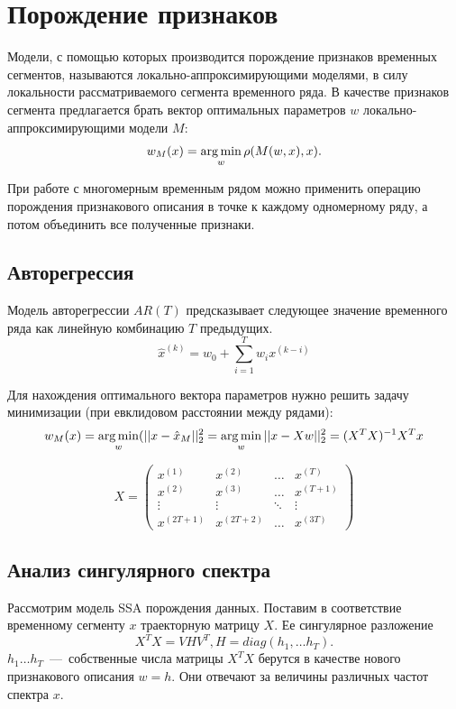 \documentclass[12pt, twoside]{article}
\begin{document}
\section{Порождение признаков}

Модели, с помощью которых производится порождение признаков временных сегментов, называются локально-аппроксимирующими моделями, в силу локальности рассматриваемого сегмента временного ряда. В качестве признаков сегмента предлагается брать вектор оптимальных параметров $w$ локально-аппроксимирующими модели $M$: $$w_M(x)=\argmin\limits_{w}\rho(M(w,x),x).$$

При работе с многомерным временным рядом можно применить операцию порождения признакового описания в точке к каждому одномерному ряду, а потом объединить все полученные признаки.


\subsection{Авторегрессия}
Модель авторегрессии $AR(T)$ предсказывает следующее значение временного ряда как линейную комбинацию $T$ предыдущих.
$$\hat x^{(k)}=w_0+\sum\limits_{i=1}^T w_i x^{(k-i)}$$

Для нахождения оптимального вектора параметров нужно решить задачу минимизации (при евклидовом расстоянии между рядами):
$$w_M(x)=\argmin_w(||x-\hat x_M||_2^2=\argmin_w||x-Xw||_2^2=(X^TX)^{-1}X^Tx$$

\begin{equation*}
X = \left(
\begin{array}{cccc}
x^{(1)} & x^{(2)} & \ldots & x^{(T)}\\
x^{(2)} & x^{(3)} & \ldots & x^{(T+1)}\\
\vdots & \vdots & \ddots & \vdots\\
x^{(2T+1)} & x^{(2T+2)} & \ldots & x^{(3T)}
\end{array}
\right)
\end{equation*}

\subsection{ Анализ сингулярного спектра}
Рассмотрим модель SSA порождения данных. Поставим в соответствие временному сегменту $x$ траекторную матрицу $X$. Ее сингулярное разложение $$X^TX=VHV^T, H = diag(h_1,\ldots h_T).$$ $h_1\ldots h_T$~---~собственные числа матрицы $X^TX$ берутся в качестве нового признакового описания $w=h$. Они отвечают за величины различных частот спектра $x$.
\end{document}
